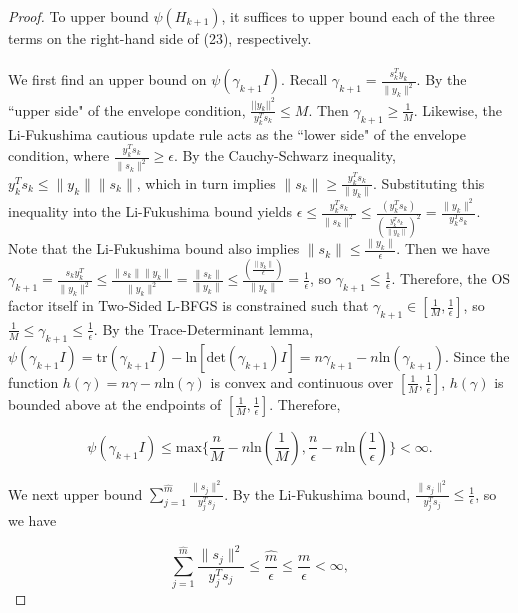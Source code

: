 \documentclass[10pt,a4paper]{amsart}
\begin{document}
\begin{proof}
\noindent
To upper bound $\psi(H_{k+1})$, it suffices to upper bound each of the three terms on the right-hand side of (23), respectively. \\
\\
We first find an upper bound on $\psi(\gamma_{k+1}I)$. Recall $\gamma_{k+1} = \frac{s_k^Ty_k}{\|y_k\|^2}$. By the ``upper side" of the envelope condition, $\frac{||y_k||^2}{y_k^Ts_k} \leq M$. Then $\gamma_{k+1} \geq \frac{1}{M}$. Likewise, the Li-Fukushima cautious update rule acts as the ``lower side" of the envelope condition, where $\frac{y_k^T s_k}{\|s_k\|^2} \geq \epsilon$. By the Cauchy-Schwarz inequality, $y_k^T s_k \leq \|y_k\| \|s_k\|$, which in turn implies $\|s_k\| \geq \frac{y_k^T s_k}{\|y_k\|}$. Substituting this inequality into the Li-Fukushima bound yields $\epsilon \leq \frac{y_k^T s_k}{\|s_k\|^2} \leq \frac{(y_k^T s_k)}{(\frac{y_k^T s_k}{\|y_k\|})^2} = \frac{\|y_k\|^2}{y_k^T s_k}$. Note that the Li-Fukushima bound also implies $\|s_k\| \leq \frac{\|y_k\|}{\epsilon}$. Then we have $\gamma_{k+1} = \frac{s_k y_k^T}{\|y_k\|^2} \leq \frac{\|s_k\| \|y_k\|}{\|y_k\|^2} = \frac{\|s_k\|}{\|y_k\|} \leq \frac{(\frac{\|y_k\|}{\epsilon})}{\|y_k\|} = \frac{1}{\epsilon}$, so $\gamma_{k+1} \leq \frac{1}{\epsilon}$. Therefore, the OS factor itself in Two-Sided L-BFGS is constrained such that $\gamma_{k+1} \in [\frac{1}{M}, \frac{1}{\epsilon}]$, so $\frac{1}{M} \leq \gamma_{k+1} \leq \frac{1}{\epsilon}$. By the Trace-Determinant lemma, $\psi(\gamma_{k+1}I) = \text{tr}(\gamma_{k+1}I) - \text{ln}[\text{det}(\gamma_{k+1})I] = n\gamma_{k+1} - n\text{ln}(\gamma_{k+1})$. Since the function $h(\gamma) = n\gamma - n\text{ln}(\gamma)$ is convex and continuous over $[\frac{1}{M}, \frac{1}{\epsilon}]$, $h(\gamma)$ is bounded above at the endpoints of $[\frac{1}{M}, \frac{1}{\epsilon}]$. Therefore,

\begin{equation}
\psi(\gamma_{k+1}I) \leq \text{max}\{\frac{n}{M}-n\text{ln}(\frac{1}{M}), \frac{n}{\epsilon}-n\text{ln}(\frac{1}{\epsilon})\} < \infty.
\end{equation}

\noindent
We next upper bound $\sum_{j=1}^{\hat{m}} \frac{\|s_j\|^2}{y_j^T s_j}$. By the Li-Fukushima bound, $\frac{\|s_j\|^2}{y_j^T s_j} \leq \frac{1}{\epsilon}$, so we have

\begin{equation}
\sum_{j=1}^{\hat{m}} \frac{\|s_j\|^2}{y_j^T s_j} \leq \frac{\hat{m}}{\epsilon} \leq \frac{m}{\epsilon} < \infty,
\end{equation}


\end{proof}
\end{document}
